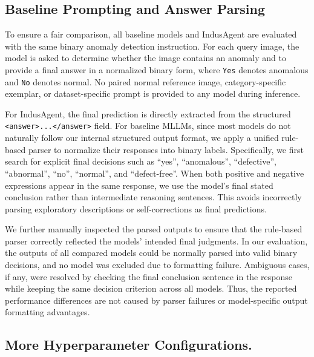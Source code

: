 \documentclass{llmxive}
\begin{document}
{\subsection{Baseline Prompting and Answer Parsing}
\label{appx:baseline_parsing}

To ensure a fair comparison, all baseline models and IndusAgent are evaluated with the same binary anomaly detection instruction. 
For each query image, the model is asked to determine whether the image contains an anomaly and to provide a final answer in a normalized binary form, where \texttt{Yes} denotes anomalous and \texttt{No} denotes normal. 
No paired normal reference image, category-specific exemplar, or dataset-specific prompt is provided to any model during inference.

For IndusAgent, the final prediction is directly extracted from the structured \texttt{<answer>...</answer>} field. 
For baseline MLLMs, since most models do not naturally follow our internal structured output format, we apply a unified rule-based parser to normalize their responses into binary labels. 
Specifically, we first search for explicit final decisions such as ``yes'', ``anomalous'', ``defective'', ``abnormal'', ``no'', ``normal'', and ``defect-free''. 
When both positive and negative expressions appear in the same response, we use the model's final stated conclusion rather than intermediate reasoning sentences. 
This avoids incorrectly parsing exploratory descriptions or self-corrections as final predictions.

We further manually inspected the parsed outputs to ensure that the rule-based parser correctly reflected the models' intended final judgments. 
In our evaluation, the outputs of all compared models could be normally parsed into valid binary decisions, and no model was excluded due to formatting failure. 
Ambiguous cases, if any, were resolved by checking the final conclusion sentence in the response while keeping the same decision criterion across all models. 
Thus, the reported performance differences are not caused by parser failures or model-specific output formatting advantages.



\subsection{More Hyperparameter Configurations.}

}
\end{document}
